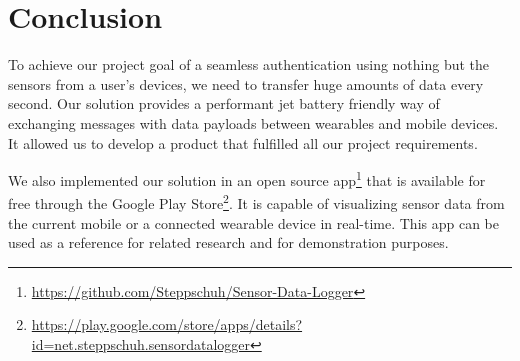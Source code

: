 \section{Conclusion}
\label{sec:conclusion}

To achieve our project goal of a seamless authentication using nothing but the sensors from a user's devices, we need to transfer huge amounts of data every second.
Our solution provides a performant jet battery friendly way of exchanging messages with data payloads between wearables and mobile devices.
It allowed us to develop a product that fulfilled all our project requirements.

We also implemented our solution in an open source app\footnote{\href{https://github.com/Steppschuh/Sensor-Data-Logger}{https://github.com/Steppschuh/Sensor-Data-Logger}} that is available for free through the Google Play Store\footnote{\href{https://play.google.com/store/apps/details?id=net.steppschuh.sensordatalogger}{https://play.google.com/store/apps/details?id=net.steppschuh.sensordatalogger}}.
It is capable of visualizing sensor data from the current mobile or a connected wearable device in real-time.
This app can be used as a reference for related research and for demonstration purposes.


\clearpage